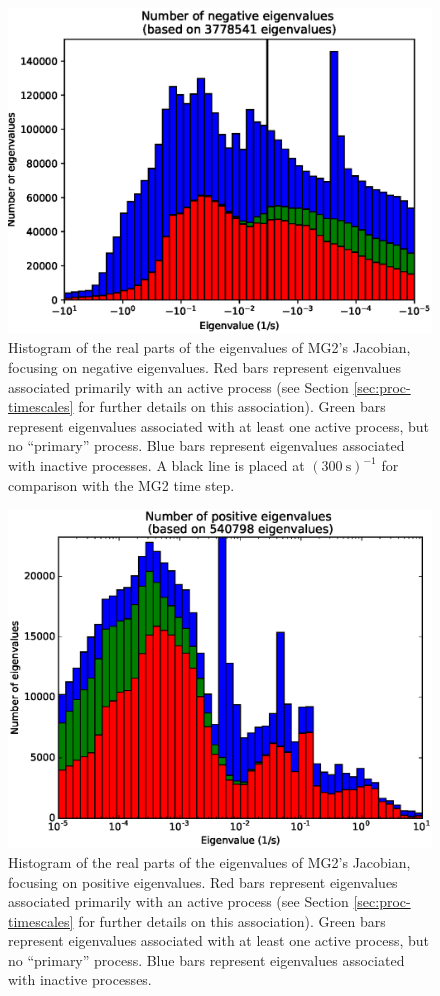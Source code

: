 \documentclass [11pt, proquest] {uwthesis}[2020/02/24]
\begin{document}
\begin{figure}[ht]
  \includegraphics[width=6.5in]{./time_hist_all_values_neg.eps}
  \caption{Histogram of the real parts of the eigenvalues of MG2's Jacobian, focusing on negative eigenvalues. Red bars represent eigenvalues associated primarily with an active process (see Section \ref{sec:proc-timescales} for further details on this association). Green bars represent eigenvalues associated with at least one active process, but no ``primary'' process. Blue bars represent eigenvalues associated with inactive processes. A black line is placed at $(\SI{300}{\second})^{-1}$ for comparison with the MG2 time step.}
  \label{neg-eig-hist}
\end{figure}

\begin{figure}[ht]
  \includegraphics[width=6.5in]{./time_hist_all_values_pos.eps}
  \caption{Histogram of the real parts of the eigenvalues of MG2's Jacobian, focusing on positive eigenvalues. Red bars represent eigenvalues associated primarily with an active process (see Section \ref{sec:proc-timescales} for further details on this association). Green bars represent eigenvalues associated with at least one active process, but no ``primary'' process. Blue bars represent eigenvalues associated with inactive processes.}
  \label{pos-eig-hist}
\end{figure}
\end{document}
